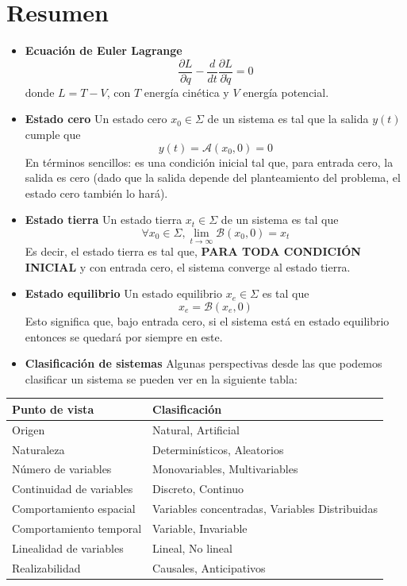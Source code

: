 \documentclass[
  11pt,
  letterpaper,
   addpoints,
   answers
  ]{exam}
\begin{document}
\section{Resumen}
\begin{itemize}
    \item \textbf{Ecuación de Euler Lagrange}
    \[
    \frac{\partial L}{\partial q} - \frac{d}{dt} \frac{\partial L}{\partial \dot{q}} = 0 \tag{1}
    \]
    donde $L = T - V$, con $T$ energía cinética y $V$ energía potencial.
    \item \textbf{Estado cero} Un estado cero $x_0 \in \Sigma$ de un sistema es tal que la salida $y(t)$ cumple que
    \[
    y(t) = \mathcal{A}(x_0, 0) = 0 \tag{2}
    \]
    En términos sencillos: es una condición inicial tal que, para entrada cero, la salida es cero (dado que la salida depende del planteamiento del problema, el estado cero también lo hará).

    \item \textbf{Estado tierra} Un estado tierra $x_t \in \Sigma$ de un sistema es tal que
    \[
    \forall x_0 \in \Sigma, \lim_{t \to \infty} \mathcal{B}(x_0, 0) = x_t \tag{3}
    \]
    Es decir, el estado tierra es tal que, \textbf{PARA TODA CONDICIÓN INICIAL} y con entrada cero, el sistema converge al estado tierra.

    \item \textbf{Estado equilibrio} Un estado equilibrio $x_e \in \Sigma$ es tal que
    \[
    x_e = \mathcal{B}(x_e, 0) \tag{4}
    \]
    Esto significa que, bajo entrada cero, si el sistema está en estado equilibrio entonces se quedará por siempre en este.

    \item \textbf{Clasificación de sistemas} Algunas perspectivas desde las que podemos clasificar un sistema se pueden ver en la siguiente tabla:
\end{itemize}

\begin{table}[h!]
\centering
\begin{tabular}{|l|l|}
\hline
\textbf{Punto de vista} & \textbf{Clasificación} \\ \hline
Origen & Natural, Artificial \\ \hline
Naturaleza & Determinísticos, Aleatorios \\ \hline
Número de variables & Monovariables, Multivariables \\ \hline
Continuidad de variables & Discreto, Continuo \\ \hline
Comportamiento espacial & Variables concentradas, Variables Distribuidas \\ \hline
Comportamiento temporal & Variable, Invariable \\ \hline
Linealidad de variables & Lineal, No lineal \\ \hline
Realizabilidad & Causales, Anticipativos \\ \hline
\end{tabular}
\end{table}
\end{document}
